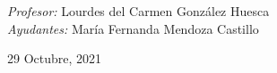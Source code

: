 \begin{center}
\begin{minipage}{0.46\textwidth}
        \begin{flushright} \large						\small										
            \emph{Profesor:} 
            Lourdes del Carmen González Huesca  \\
           \emph{Ayudantes:} 
           María Fernanda Mendoza Castillo \\
        \end{flushright}																	
    \end{minipage}	
    \vspace*{1cm}
    \vspace{2cm}
    \begin{center}						
        {\large 29 Octubre, 2021}
    \end{center}  						
\end{center}	
\textbf{}